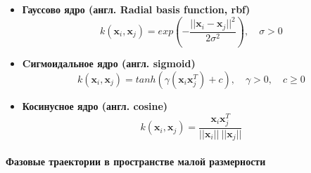 \documentclass[12pt,twoside]{article}
\begin{document}
\begin{itemize}
\item \textbf{Гауссово ядро (англ. Radial basis function, rbf)}
\begin{equation}
	k(\mathbf{x}_i,\mathbf{x}_j) = exp\left(-\frac{||\mathbf{x}_i-\mathbf{x}_j||^2}{2\sigma^2}\right),
	\quad \sigma > 0
\label{eq:kernel_rbf}
\end{equation}
\end{itemize}

\begin{itemize}
\item \textbf{Cигмоидальное ядро (англ. sigmoid)}
\begin{equation}
	k(\mathbf{x}_i,\mathbf{x}_j) = tanh(\gamma(\mathbf{x}_i\mathbf{x}_j^T) + c),
	\quad \gamma > 0,
	\quad c\ge0
\label{eq:kernel_sigmoid}
\end{equation}
\end{itemize}

\begin{itemize}
\item \textbf{Косинусное ядро (англ. cosine)}
\begin{equation}
	k(\mathbf{x}_i,\mathbf{x}_j) = \frac{\mathbf{x}_i\mathbf{x}_j^T}{||\mathbf{x}_i||~||\mathbf{x}_j||}
\label{eq:kernel_cosine}
\end{equation}
\end{itemize}

\paragraph{Фазовые траектории в пространстве малой размерности}
\end{document}
